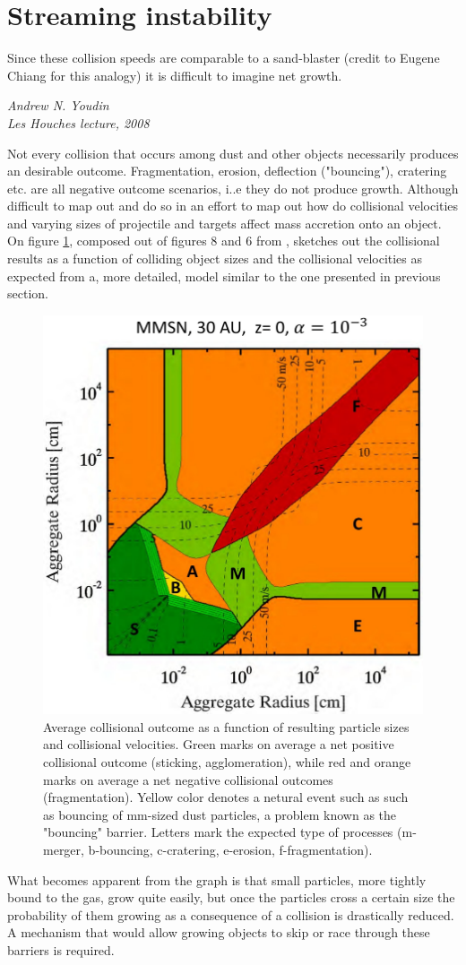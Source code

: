 \documentclass[12pt]{article}
\begin{document}
\newpage
\section{Streaming instability}

\epigraph{\centering Since these collision speeds are comparable to a sand-blaster (credit to Eugene Chiang for this analogy) it is difficult to imagine net growth.}{\textit{Andrew N. Youdin \\ Les Houches lecture, 2008}}

Not every collision that occurs among dust and other objects necessarily produces an desirable outcome. Fragmentation, erosion, deflection ("bouncing"), cratering etc. are all negative outcome scenarios, i..e they do not produce growth. Although difficult to map out \cite{Windmark12} and \cite{Birnstiel2016} do so in an effort to map out how do collisional velocities and varying sizes of projectile and targets affect mass accretion onto an object. On figure \ref{fig:coloutcomes}, composed out of figures 8 and 6 from \citet{Windmark12}, \cite{Fulle} sketches out the collisional results as a function of colliding object sizes and the collisional velocities as expected from a, more detailed, model similar to the one presented in previous section. 
\begin{figure}[htbp]
    \label{fig:coloutcomes}
    \centering
    \includegraphics[width=0.5\linewidth]{FulleGraph.png}
    \caption{Average collisional outcome as a function of resulting particle sizes and collisional velocities. Green marks on average a net positive collisional outcome (sticking, agglomeration), while red and orange marks on average a net negative collisional outcomes (fragmentation). Yellow color denotes a netural event such as such as bouncing of mm-sized dust particles, a problem known as the "bouncing" barrier. Letters mark the expected type of processes (m-merger, b-bouncing, c-cratering, e-erosion, f-fragmentation). }
\end{figure}
What becomes apparent from the graph is that small particles, more tightly bound to the gas, grow quite easily, but once the particles cross a certain size the probability of them growing as a consequence of a collision is drastically reduced. A mechanism that would allow growing objects to skip or race through these barriers is required. 
\end{document}
